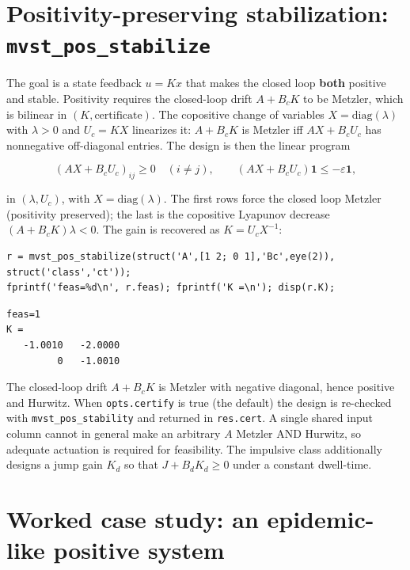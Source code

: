 \documentclass[11pt,oneside]{report}
\newcommand{\code}[1]{\texttt{#1}}
\begin{document}
\hypertarget{positivity-preserving-stabilization-mvst_pos_stabilize}{%
\section{\texorpdfstring{Positivity-preserving stabilization: \code{mvst\_pos\_stabilize}}{Positivity-preserving stabilization: mvst\_pos\_stabilize}}\label{positivity-preserving-stabilization-mvst_pos_stabilize}}

The goal is a state feedback \(u = K x\) that makes the closed loop \textbf{both}
positive and stable. Positivity requires the closed-loop drift \(A + B_c K\) to be
Metzler, which is bilinear in \((K, \text{certificate})\). The copositive change of
variables \(X = \mathrm{diag}(\lambda)\) with \(\lambda > 0\) and \(U_c = K X\)
linearizes it: \(A + B_c K\) is Metzler iff \(A X + B_c U_c\) has nonnegative
off-diagonal entries. The design is then the linear program

\[
(A X + B_c U_c)_{ij} \ge 0 \quad (i \ne j),
\qquad
(A X + B_c U_c)\mathbf{1} \le -\varepsilon \mathbf{1},
\]

in \((\lambda, U_c)\), with \(X = \mathrm{diag}(\lambda)\). The first rows force the
closed loop Metzler (positivity preserved); the last is the copositive Lyapunov
decrease \((A + B_c K)\lambda < 0\). The gain is recovered as \(K = U_c X^{-1}\):

\begin{lstlisting}[style=matlabstyle]
r = mvst_pos_stabilize(struct('A',[1 2; 0 1],'Bc',eye(2)), struct('class','ct'));
fprintf('feas=%d\n', r.feas); fprintf('K =\n'); disp(r.K);
\end{lstlisting}

\begin{lstlisting}[style=outputstyle]
feas=1
K =
   -1.0010   -2.0000
         0   -1.0010
\end{lstlisting}

The closed-loop drift \(A + B_c K\) is Metzler with negative diagonal, hence
positive and Hurwitz. When \code{opts.certify} is true (the default) the design is
re-checked with \code{mvst\_pos\_stability} and returned in \code{res.cert}. A single shared
input column cannot in general make an arbitrary \(A\) Metzler AND Hurwitz, so
adequate actuation is required for feasibility. The impulsive class additionally
designs a jump gain \(K_d\) so that \(J + B_d K_d \ge 0\) under a constant
dwell-time.

\hypertarget{worked-case-study-an-epidemic-like-positive-system}{%
\section{Worked case study: an epidemic-like positive system}\label{worked-case-study-an-epidemic-like-positive-system}}
\end{document}
